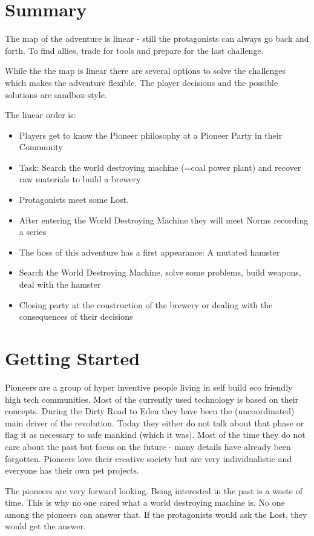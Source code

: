 \section{Summary}

The map of the adventure is linear - still the protagonists can always go back and forth. To find allies, trade for tools and prepare for the last challenge.

While the the map is linear there are several options to solve the challenges which makes the adventure flexible. The player decisions and the possible solutions are sandbox-style.

The linear order is:

\begin{itemize}
\item Players get to know the Pioneer philosophy at a Pioneer Party in their Community
\item Task: Search the world destroying machine (=coal power plant) and recover raw materials to build a brewery
\item Protagonists meet some Lost.
\item After entering the World Destroying Machine they will meet Norms recording a series
\item The boss of this adventure has a first appearance: A mutated hamster
\item Search the World Destroying Machine, solve some problems, build weapons, deal with the hamster
\item Closing party at the construction of the brewery or dealing with the consequences of their decisions
\end{itemize}

\section{Getting Started}

\begin{sidebarBox}[title=Pioneers]
Pioneers are a group of hyper inventive people living in self build eco friendly high tech communities. Most of the currently used technology is based on their concepts. During the Dirty Road to Eden they have been the (uncoordinated) main driver of the revolution. Today they either do not talk about that phase or flag it as necessary to safe mankind (which it was). Most of the time they do not care about the past but focus on the future - many details have already been forgotten. Pioneers love their creative society but are very individualistic and everyone has their own pet projects.

The pioneers are very forward looking. Being interested in the past is a waste of time. This is why no one cared what a world destroying machine is. No one among the pioneers can answer that. If the protagonists would ask the Lost, they would get the answer.
\end{sidebarBox}

